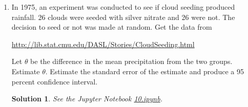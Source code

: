 \documentclass[10pt]{article}
\newtheorem*{sol}{Solution}
\begin{document}
\begin{enumerate}
\item In 1975, an experiment was conducted to see if cloud seeding produced
rainfall. 26 clouds were seeded with silver nitrate and 26 were not. The
decision to seed or not was made at random. Get the data from
\begin{center}
\href{http://lib.stat.cmu.edu/DASL/Stories/CloudSeeding.html}
{http://lib.stat.cmu.edu/DASL/Stories/CloudSeeding.html}
\end{center}
Let $\theta$ be the difference in the mean precipitation from the two groups.
Estimate $\theta$. Estimate the standard error of the estimate and produce a
95 percent confidence interval.

\begin{sol}
See the Jupyter Notebook
\href{https://github.com/ajrasmus/some_of_statistics/blob/main/chapter_7/10.ipynb}{10.ipynb}.
\end{sol}
\end{enumerate}
\end{document}

